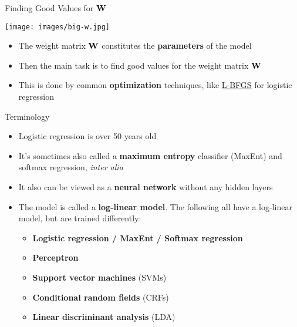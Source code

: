 \documentclass[xcolor=pdftex,x11names,table,hyperref]{beamer}
\begin{document}
\begin{frame}{Finding Good Values for $\bf W$}
	\begin{center}
	\texttt{[image: images/big-w.jpg]}
	\end{center}
\begin{itemize}
	\item The weight matrix $\bf W$ constitutes the \textbf{parameters} of the model
	\item Then the main task is to find good values for the weight matrix $\bf W$
	\item This is done by common \textbf{optimization} techniques, like \href{https://en.wikipedia.org/wiki/Limited-memory_BFGS}{L-BFGS} for logistic regression
\end{itemize}
\end{frame}

\begin{frame}{Terminology}
\begin{itemize}
	\item Logistic regression is over 50 years old
	\pause
	\item It's sometimes also called a \textbf{maximum entropy} classifier (MaxEnt) and softmax regression, \textit{inter alia}
	\item It also can be viewed as a \textbf{neural network} without any hidden layers
	\pause
	\item The model is called a \textbf{log-linear model}.  The following all have a log-linear model, but are trained differently:
	\begin{itemize}
		\item \textbf{Logistic regression / MaxEnt / Softmax regression}
		\item \textbf{Perceptron}
		\item \textbf{Support vector machines} (SVMs)
		\item \textbf{Conditional random fields} (CRFs)
		\item \textbf{Linear discriminant analysis} (LDA)
	\end{itemize}
\end{itemize}
\end{frame}




\end{document}
